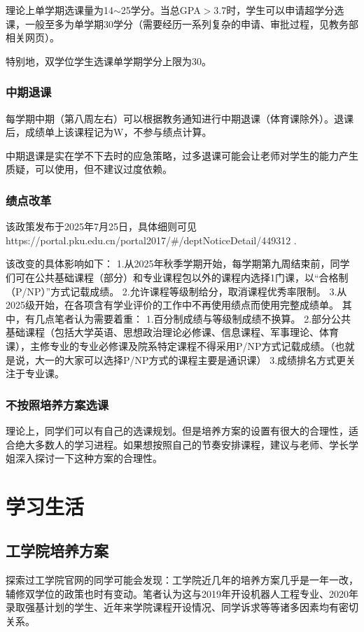 \documentclass[11pt,oneside]{book}
\begin{document}
理论上单学期选课量为14$\sim$25学分。当总GPA$>$3.7时，学生可以申请超学分选课，一般至多为单学期30学分（需要经历一系列复杂的申请、审批过程，见教务部相关网页）。

特别地，双学位学生选课单学期学分上限为30。

\subsection{中期退课}
每学期中期（第八周左右）可以根据教务通知进行中期退课（体育课除外）。退课后，成绩单上该课程记为W，不参与绩点计算。

中期退课是实在学不下去时的应急策略，过多退课可能会让老师对学生的能力产生质疑，可以使用，但不建议过度依赖。

\subsection{绩点改革}
该政策发布于2025年7月25日，具体细则可见https://portal.pku.edu.cn/portal2017/#/deptNoticeDetail/449312 .

该改变的具体影响如下：
1.从2025年秋季学期开始，每学期第九周结束前，同学们可在公共基础课程（部分）和专业课程包以外的课程内选择1门课，以“合格制（P/NP）”方式记载成绩。
2.允许课程等级制给分，取消课程优秀率限制。
3.从2025级开始，在各项含有学业评价的工作中不再使用绩点而使用完整成绩单。
其中，有几点笔者认为需要着重：
1.百分制成绩与等级制成绩不换算。
2.部分公共基础课程（包括大学英语、思想政治理论必修课、信息课程、军事理论、体育课），主修专业的专业必修课及院系特定课程不得采用P/NP方式记载成绩。（也就是说，大一的大家可以选择P/NP方式的课程主要是通识课）
3.成绩排名方式更关注于专业课。

\subsection{不按照培养方案选课}
理论上，同学们可以有自己的选课规划。但是培养方案的设置有很大的合理性，适合绝大多数人的学习进程。如果想按照自己的节奏安排课程，建议与老师、学长学姐深入探讨一下这种方案的合理性。

\chapter{学习生活}
\section{工学院培养方案}
探索过工学院官网的同学可能会发现：工学院近几年的培养方案几乎是一年一改，辅修双学位的政策也时有变动。笔者认为这与2019年开设机器人工程专业、2020年录取强基计划的学生、近年来学院课程开设情况、同学诉求等等诸多因素均有密切关系。
\end{document}
